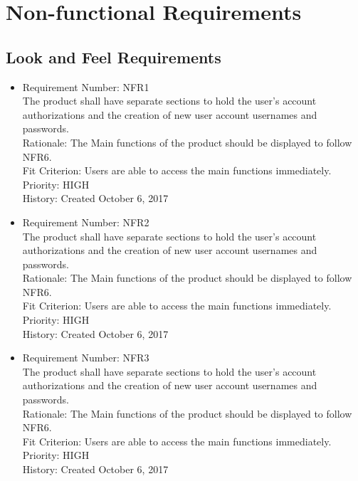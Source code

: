 \documentclass[12pt, titlepage]{article}
\begin{document}
\section{Non-functional Requirements}

\subsection{Look and Feel Requirements}
\begin{itemize}
	\item Requirement Number: NFR1\\
The product shall have separate sections to hold the user’s account authorizations and the creation of new user account usernames and passwords.\\
Rationale: The Main functions of the product should be displayed to follow NFR6.\\
Fit Criterion: Users are able to access the main functions immediately.\\
Priority: HIGH\\
History: Created October 6, 2017
	\item Requirement Number: NFR2\\
The product shall have separate sections to hold the user’s account authorizations and the creation of new user account usernames and passwords.\\
Rationale: The Main functions of the product should be displayed to follow NFR6.\\
Fit Criterion: Users are able to access the main functions immediately.\\
Priority: HIGH\\
History: Created October 6, 2017
	\item Requirement Number: NFR3\\
The product shall have separate sections to hold the user’s account authorizations and the creation of new user account usernames and passwords.\\
Rationale: The Main functions of the product should be displayed to follow NFR6.\\
Fit Criterion: Users are able to access the main functions immediately.\\
Priority: HIGH\\
History: Created October 6, 2017


\end{itemize}
\end{document}
